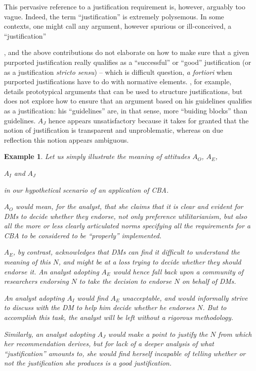 \documentclass[preprint, french, english, 11pt, authoryear]{elsarticle}%
\newtheorem{example}{Example}
\begin{document}
This pervasive reference to a justification requirement is, however, arguably too vague. Indeed, the term ``justification'' is extremely polysemous. 
In some contexts, one might call any argument, however spurious or ill-conceived, a ``justification''\begin{changebar}, and the above contributions do not elaborate on how to make sure that a given purported justification really qualifies as a ``successful'' or ``good'' justification (or as a justification \emph{stricto sensu}) -- which is difficult question, \emph{a fortiori} when purported justifications have to do with normative elements.
\citet{jackson_towards_1999}, for example, details prototypical arguments that can be used to structure justifications, but does not explore how to ensure that an argument based on his guidelines qualifies as a justification: his ``guidelines'' are, in that sense, more ``buiding blocks'' than guidelines. 
$A_J$ hence appears unsatisfactory because it takes for granted that the notion of justification is transparent and unproblematic, whereas on due reflection this notion appears ambiguous.
\end{changebar}

\begin{example}
Let us simply illustrate the meaning of attitudes $A_O$, $A_E$, \begin{changebar}$A_I$ and $A_J$\end{changebar} in our hypothetical scenario of an application of \ac{CBA}.

$A_O$ would mean, for the analyst, that she claims that it is clear and evident for \acp{DM} to decide whether they endorse, not only preference utilitarianism, but also all the more or less clearly articulated norms specifying all the requirements for a \ac{CBA} to be considered to be ``properly'' implemented.

$A_E$, by contrast, acknowledges that \acp{DM} can find it difficult to understand the meaning of this $N$, and might be at a loss trying to decide whether they should endorse it. 
An analyst adopting $A_E$ would hence fall back upon a community of researchers endorsing $N$ to take the decision to endorse $N$ on behalf of \acp{DM}.

An analyst adopting $A_I$ would find $A_E$ unacceptable, and would informally strive to discuss with the \ac{DM} to help him decide whether he endorses $N$. But to accomplish this task, the analyst will be left without a rigorous methodology.
\begin{changebar}
Similarly, an analyst adopting $A_J$ would make a point to justify the $N$ from which her recommendation derives, but for lack of a deeper analysis of what ``justification'' amounts to, she would find herself incapable of telling whether or not the justification she produces is a good justification.
\end{changebar}
\end{example}
\end{document}
